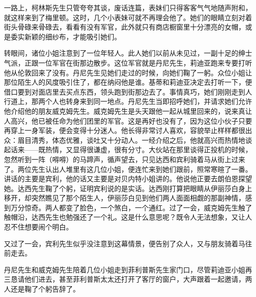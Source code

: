 \par 一路上，柯林斯先生只管夸夸其谈，废话连篇，表妹们只得客客气气地随声附和，就这样来到了梅里顿。这时，几个小表妹可就不再理会他了。她们的眼睛立刻对着街头骨碌来骨碌去，看看有没有军官，此外就只有商店橱窗里十分漂亮的女帽，或是委实新颖的细纱布，才能吸引她们。
\par 转眼间，诸位小姐注意到了一位年轻人。此人她们以前从未见过，一副十足的绅士气派，正跟一位军官在街那边散步。这位军官就是丹尼先生，莉迪亚跑来专要打听他从伦敦回来了没有。丹尼先生见她们走过的时候，向她们鞠了一躬。众位小姐让那位陌生人的风度吸引住了，都在纳闷他是谁。基蒂和莉迪亚决定去打听一下，便借口要到对面店里去买点东西，领头跑到街那边去了。事情真巧，她们刚刚走到人行道上，那两个人也转身来到同一地点。丹尼先生当即招呼她们，并请求她们允许他介绍他的朋友威克姆先生。威克姆先生是头天跟他一起从城里回来的，说来真让人高兴，他已被任命为他们团里的军官。这是再好也没有了，因为这位小伙子只要再穿上一身军装，便会变得十分迷人。他长得非常讨人喜欢，容貌举止样样都很出众：眉目清秀，体态优雅，谈吐又十分动人。一经介绍之后，他就高兴而热情地谈起话来——既热情，又显得很谦虚，很有分寸。大伙站在那里谈得正投机的时候，忽然听到一阵（嘚嘚）的马蹄声，循声望去，只见达西和宾利骑着马从街上过来了。两位先生认出人堆里有这几位小姐，便连忙来到她们跟前，照常寒暄了一番。讲话的主要是宾利，他的话又主要是对贝内特小姐讲的。他说他正要去朗伯恩探望她。达西先生鞠了个躬，证明宾利说的是实话。达西刚打算把眼睛从伊丽莎白身上移开，却突然瞧见了那个陌生人，伊丽莎白见到他们两人面面相觑的那副神情，感到万分惊奇。两人都变了脸色，一个煞白，一个通红。过了一会，威克姆先生触了触帽沿，达西先生也勉强还了一个礼。这是什么意思呢？既令人无法想象，又让人忍不住想要闹个明白。
\par 又过了一会，宾利先生似乎没注意到这幕情景，便告别了众人，又与朋友骑着马往前走去。
\par 丹尼先生和威克姆先生陪着几位小姐走到菲利普斯先生家门口，尽管莉迪亚小姐再三恳请他们进去，甚至菲利普斯太太还打开了客厅的窗户，大声跟着一起邀请，两人还是鞠了个躬告辞了。
